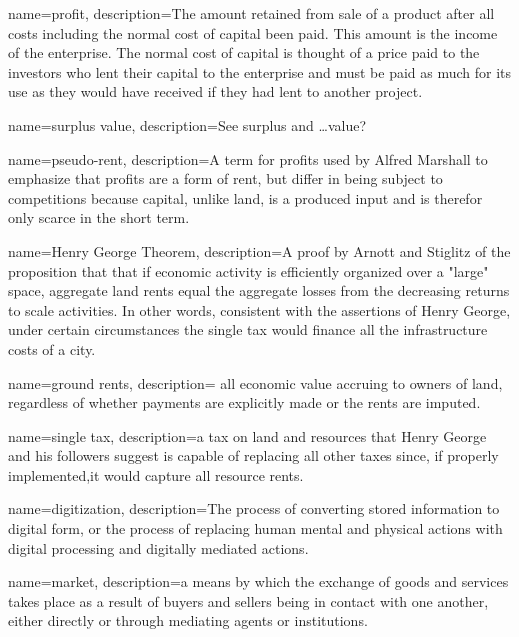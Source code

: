 {
name=profit,
description={The amount retained from sale of a product after all costs including the normal cost of capital  been paid. This amount is the income of the enterprise. The normal cost of capital is thought of a price paid to the investors who lent their capital to the enterprise and must be paid as  much for its use as they would have received if they had lent to another project. }
}

{
name=surplus value,
description={See \gls{surplus} and \dots value?}
}

{
name=pseudo-rent,
description={A term for profits used by Alfred Marshall to emphasize that profits are a form of rent, but differ in being subject to competitions  because capital, unlike land, is a produced input and is therefor only scarce in the short term. }
}

{
name=Henry George Theorem,
description={A proof by Arnott and Stiglitz \cite{arnottAggregateLandRents1979} of the proposition that  that if economic activity is efficiently organized over a "large" space, aggregate land rents equal the aggregate losses from the decreasing returns to scale activities. In other words, consistent with the assertions of Henry George, under certain circumstances the \gls{single tax} would finance all the infrastructure costs of a city. }
}

{
name=ground rents,
description={ all economic value accruing to owners of land, regardless of whether payments are explicitly made or the rents are imputed.}
}

{
name=single tax,
description={a tax on land and resources that Henry George and his followers suggest is capable of replacing all other taxes since, if properly implemented,it would capture all resource rents. }
}

{
name=digitization,
description={The process of converting stored information to digital form, or the process of replacing human mental and physical actions with digital processing and digitally mediated actions.}
}

{
name=market,
description={a means by which the exchange of goods and services takes place as a result of buyers and sellers being in contact with one another, either directly or through mediating agents or institutions.}%
}


